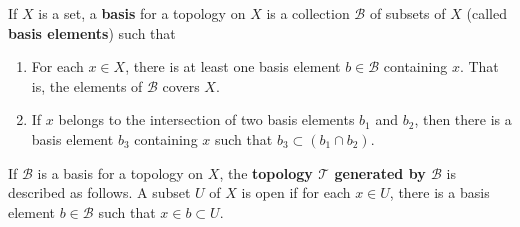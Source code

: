 \documentclass{article}
\begin{document}
    \begin{definition}
    If $X$ is a set, a \textbf{basis} for a topology on $X$ is a collection $\mathscr{B}$ of subsets of $X$ (called \textbf{basis elements}) such that
    \begin{enumerate}
        \item For each $x \in X$, there is at least one basis element $b \in \mathscr{B}$ containing $x$. That is, the elements of $\mathscr{B}$ covers $X$. 
        \item If $x$ belongs to the intersection of two basis elements $b_1$ and $b_2$, then there is a basis element $b_3$ containing $x$ such that $b_3 \subset (b_1 \cap b_2)$. 
    \end{enumerate}
    \begin{center}
    \end{center}
    \end{definition}

    \begin{definition}
    If $\mathscr{B}$ is a basis for a topology on $X$, the \textbf{topology $\mathscr{T}$ generated by $\mathscr{B}$} is described as follows. A subset $U$ of $X$ is open if for each $x \in U$, there is a basis element $b \in \mathscr{B}$ such that $x \in b \subset U$. 
    \end{definition}
    \begin{center}
    \end{center}
\end{document}
